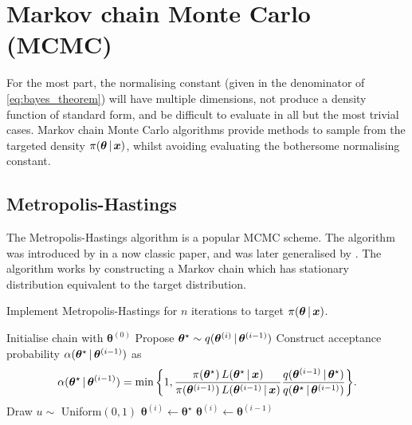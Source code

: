 \section{Markov chain Monte Carlo (MCMC)}
\label{sec:mcmc}

For the most part, the normalising constant (given in the denominator of
\cref{eq:bayes_theorem}) will have multiple dimensions, not produce a density function of
standard form, and be difficult to evaluate in all but the most trivial cases. Markov
chain Monte Carlo algorithms provide methods to sample from the targeted density
$\pi(\bm{\theta} \,|\, \bm{x})$, whilst avoiding evaluating the bothersome normalising
constant.

\subsection{Metropolis-Hastings}
\label{ssec:metropolis_hastings}

The Metropolis-Hastings algorithm is a popular MCMC scheme. The algorithm was introduced
by \textcite{metropolis53} in a now classic paper, and was later generalised by
\textcite{hastings70}. The algorithm works by constructing a Markov chain which has
stationary distribution equivalent to the target distribution.

\begin{algorithm}
  \caption{Implement Metropolis-Hastings for $n$ iterations to target $\pi(\bm{\theta} \,|\, \bm{x})$.}
  \label{alg:metropolis_hastings}
  \begin{algorithmic}[1]
    \State Initialise chain with $\bm{\theta}^{(0)}$
      \State Propose ${\bm{\theta}}^\star \sim q(\bm{\theta}^{(i)} \,|\, \bm{\theta}^{(i-1)})$
      \State Construct acceptance probability $\alpha(\bm{\theta}^\star \,|\, \bm{\theta}^{(i-1)})$ as
      \begin{equation*}
          \alpha(\bm{\theta}^\star \given \bm{\theta}^{(i-1)}) =
        \min\bigg\{1,
        \frac{\pi(\bm{\theta}^\star) \, L(\bm{\theta}^\star \given \bm{x})}%
        {\pi(\bm{\theta}^{(i-1)}) \, L(\bm{\theta}^{(i-1)} \given \bm{x})}
        \frac{q(\bm{\theta}^{(i-1)} \given \bm{\theta}^\star)}%
        {q(\bm{\theta}^\star \given \bm{\theta}^{(i-1)})}
        \bigg\}.
      \end{equation*}
      \State Draw $u \sim$ Uniform$(0, 1)$
        \State {}
        \State $\bm{\theta}^{(i)} \leftarrow \bm{\theta}^\star$
      \Else
        \State {}
        \State $\bm{\theta}^{(i)} \leftarrow \bm{\theta}^{(i-1)}$
      \EndIf
    \EndFor
  \end{algorithmic}
\end{algorithm}

